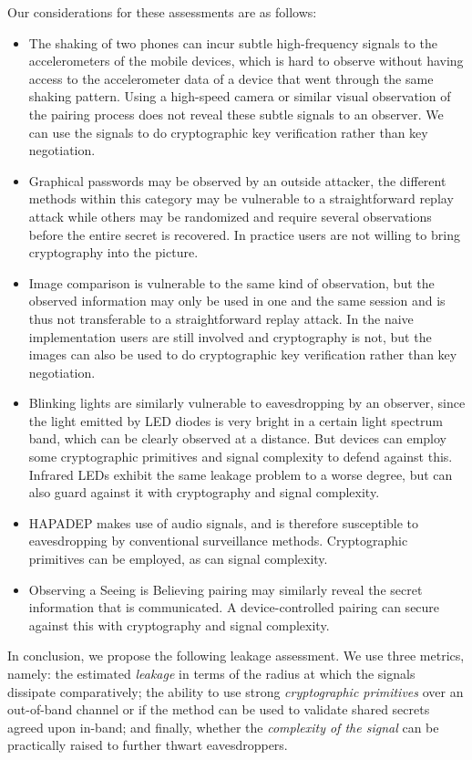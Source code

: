 \documentclass[conference, 12pt]{sty/IEEEtran}
\begin{document}
Our considerations for these assessments are as follows:
\begin{itemize}
	\item The shaking of two phones can incur subtle high-frequency signals to the accelerometers of the mobile devices, which is hard to observe without having access to the accelerometer data of a device that went through the same shaking pattern.
	Using a high-speed camera or similar visual observation of the pairing process does not reveal these subtle signals to an observer.
	We can use the signals to do cryptographic key verification rather than key negotiation.

	\item Graphical passwords may be observed by an outside attacker, the different methods within this category may be vulnerable to a straightforward replay attack while others may be randomized and require several observations before the entire secret is recovered. In practice users are not willing to bring cryptography into the picture.
	\item Image comparison is vulnerable to the same kind of observation, but the observed information may only be used in one and the same session and is thus not transferable to a straightforward replay attack.
	In the naive implementation users are still involved and cryptography is not, but the images can also be used to do cryptographic key verification rather than key negotiation.
	\item Blinking lights are similarly vulnerable to eavesdropping by an observer, since the light emitted by LED diodes is very bright in a certain light spectrum band, which can be clearly observed at a distance. But devices can employ some cryptographic primitives and signal complexity to defend against this.
	Infrared LEDs exhibit the same leakage problem to a worse degree, but can also guard against it with cryptography and signal complexity.
	\item HAPADEP makes use of audio signals, and is therefore susceptible to eavesdropping by conventional surveillance methods. Cryptographic primitives can be employed, as can signal complexity.
	\item Observing a Seeing is Believing pairing may similarly reveal the secret information that is communicated. A device-controlled pairing can secure against this with cryptography and signal complexity.
\end{itemize}

In conclusion, we propose the following leakage assessment.
We use three metrics, namely: the estimated \emph{leakage} in terms of the radius at which the signals dissipate comparatively; the ability to use strong \emph{cryptographic primitives} over an out-of-band channel or if the method can be used to validate shared secrets agreed upon in-band; and finally, whether the \emph{complexity of the signal} can be practically raised to further thwart eavesdroppers.
\end{document}
